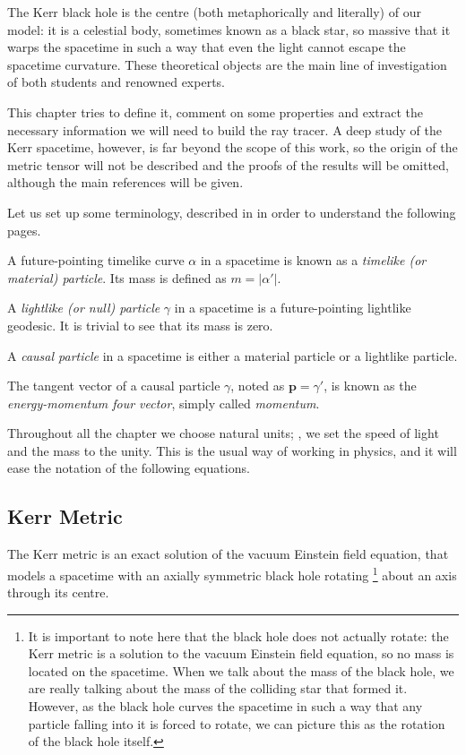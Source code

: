 The Kerr black hole is the centre (both metaphorically and literally) of our model: it is a celestial body, sometimes known as a black star, so massive that it warps the spacetime in such a way that even the light cannot escape the spacetime curvature. These theoretical objects are the main line of investigation of both students and renowned experts.

This chapter tries to define it, comment on some properties and extract the necessary information we will need to build the ray tracer. A deep study of the Kerr spacetime, however, is far beyond the scope of this work, so the origin of the metric tensor will not be described and the proofs of the results will be omitted, although the main references will be given.

Let us set up some terminology, described in \cite[Def. 1.6.2, 1.6.3]{oneill95} in order to understand the following pages.

\begin{definition}
	A future-pointing timelike curve $\alpha$ in a spacetime is known as a \emph{timelike (or material) particle}. Its mass is defined as $m = \vert \alpha' \vert$.
\end{definition}

\begin{definition}
	A \emph{lightlike (or null) particle} $\gamma$ in a spacetime is a future-pointing lightlike geodesic. It is trivial to see that its mass is zero.
\end{definition}

\begin{definition}
	A \emph{causal particle} in a spacetime is either a material particle or a lightlike particle.
\end{definition}

The tangent vector of a causal particle $\gamma$, noted as $\mathbf{p} = \gamma'$, is known as the \emph{energy-momentum four vector}, simply called \emph{momentum}.

Throughout all the chapter we choose natural units; \ie, we set the speed of light and the mass to the unity. This is the usual way of working in physics, and it will ease the notation of the following equations.

\subsection{Kerr Metric}

The Kerr metric is an exact solution of the vacuum Einstein field equation, that models a spacetime with an axially symmetric black hole rotating \footnote{It is important to note here that the black hole does not actually rotate: the Kerr metric is a solution to the vacuum Einstein field equation, so no mass is located on the spacetime. When we talk about the mass of the black hole, we are really talking about the mass of the colliding star that formed it. However, as the black hole curves the spacetime in such a way that any particle falling into it is forced to rotate, we can picture this as the rotation of the black hole itself.} about an axis through its centre.

